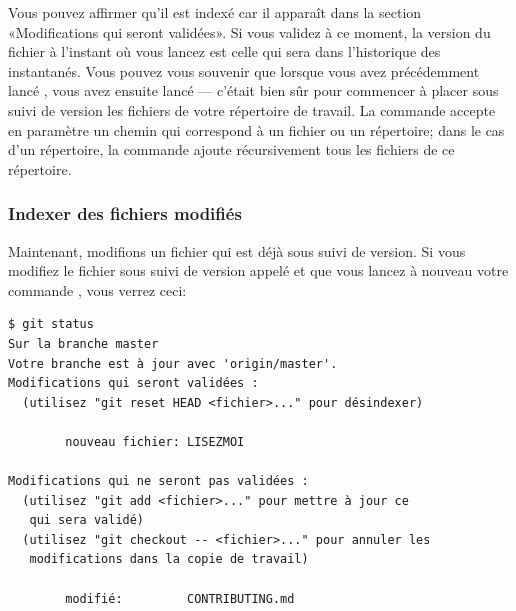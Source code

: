 Vous pouvez affirmer qu'il est indexé car il apparaît dans la section «Modifications qui seront validées».
Si vous validez à ce moment, la version du fichier à l'instant où vous lancez  est celle qui sera dans l'historique des instantanés.
Vous pouvez vous souvenir que lorsque vous avez précédemment lancé , vous avez ensuite lancé  --- c'était bien sûr pour commencer à placer sous suivi de version les fichiers de votre répertoire de travail.
La commande  accepte en paramètre un chemin qui correspond à un fichier ou un répertoire; dans le cas d'un répertoire, la commande ajoute récursivement tous les fichiers de ce répertoire.

\subsubsection{Indexer des fichiers modifiés}

Maintenant, modifions un fichier qui est déjà sous suivi de version.
Si vous modifiez le fichier sous suivi de version appelé  et que vous lancez à nouveau votre commande , vous verrez ceci:
\begin{Schunk}
\begin{Verbatim}
$ git status
Sur la branche master
Votre branche est à jour avec 'origin/master'.
Modifications qui seront validées :
  (utilisez "git reset HEAD <fichier>..." pour désindexer)

        nouveau fichier: LISEZMOI

Modifications qui ne seront pas validées :
  (utilisez "git add <fichier>..." pour mettre à jour ce
   qui sera validé)
  (utilisez "git checkout -- <fichier>..." pour annuler les
   modifications dans la copie de travail)

        modifié:         CONTRIBUTING.md
\end{Verbatim}
\end{Schunk}

